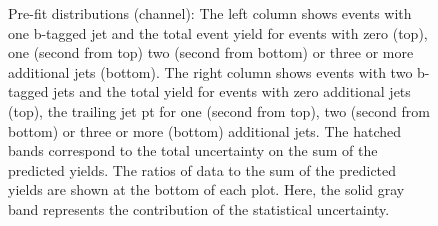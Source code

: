 \begin{figure}[htbp!]
\begin{center}
\caption{Pre-fit distributions (\mumu channel): 
  The left column shows events with one b-tagged jet and the total event yield for events with zero (top), one (second from top)
  two (second from bottom) or three or more additional jets (bottom).
  The right column shows events with two b-tagged jets and the total yield for events with zero additional jets (top),
  the trailing jet pt for one (second from top),
  two (second from bottom) or three or more (bottom) additional jets.
  The hatched bands correspond to the total uncertainty on the sum of
  the predicted yields. The ratios of data to the sum of the
  predicted yields are shown at the bottom of each plot. Here, the solid
  gray band represents the contribution of the statistical uncertainty.  
       \label{fig:xsec_mumu_inputdistr}}
  \end{center}
\end{figure}


